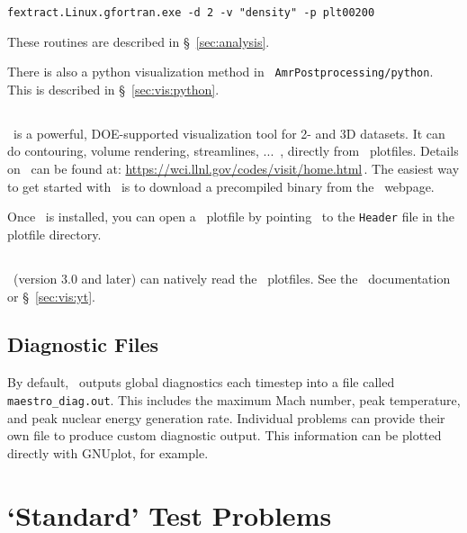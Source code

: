 \begin{verbatim}
fextract.Linux.gfortran.exe -d 2 -v "density" -p plt00200
\end{verbatim}

These routines are described in \S~\ref{sec:analysis}.

There is also a python visualization method in {\tt
AmrPostprocessing/python}.  This is described
in \S~\ref{sec:vis:python}.


\subsection{\visit}

\visit\ is a powerful, DOE-supported visualization tool for 2- and 3D
datasets.  It can do contouring, volume rendering, streamlines, ...\, ,
directly from \amrex\ plotfiles.   Details on
\visit\ can be found at:\newline
 \url{https://wci.llnl.gov/codes/visit/home.html}\,. \newline
The easiest way to get started with \visit\ is to download a precompiled
binary from the \visit\ webpage.

Once \visit\ is installed, you can open a \amrex\ plotfile by pointing
\visit\ to the {\tt Header} file in the plotfile directory.


\subsection{\yt}

\yt\ (version 3.0 and later) can natively read the \maestro\ plotfiles.  See
the \yt\ documentation or \S~\ref{sec:vis:yt}.



\subsection{Diagnostic Files}

By default, \maestro\ outputs global diagnostics each timestep into a
file called {\tt maestro\_diag.out}.  This includes the maximum Mach
number, peak temperature, and peak nuclear energy generation rate.
Individual problems can provide their own  file to
produce custom diagnostic output.  This information can be plotted
directly with {\sf GNUplot}, for example.




\section{`Standard' Test Problems}

